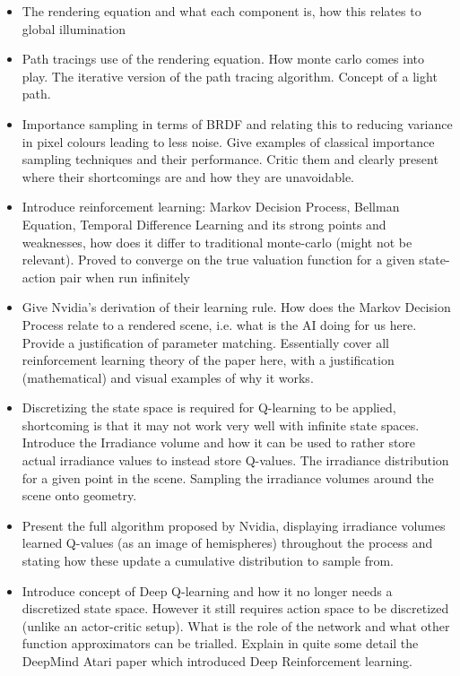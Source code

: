 \documentclass[ %
                    author={Callum Pearce},
                supervisor={Dr. Neill Campbell},
                    degree={MEng},
                     title={How effective are Temporal difference learning methods for reducing the number of zero contribution light paths while still accurately approximating Global Illumination in Path tracing?},
                  subtitle={},
                      type={research},
                      year={2019} ]{dissertation}
\begin{document}
\begin{itemize}
\item The rendering equation and what each component is, how this relates to global illumination

\item Path tracings use of the rendering equation. How monte carlo comes into play. The iterative version of the path tracing algorithm. Concept of a light path.

\item Importance sampling in terms of BRDF and relating this to reducing variance in pixel colours leading to less noise. Give examples of classical importance sampling techniques and their performance. Critic them and clearly present where their shortcomings are and how they are unavoidable.

\item Introduce reinforcement learning: Markov Decision Process, Bellman 
Equation, Temporal Difference Learning and its strong points and weaknesses,
 how does it differ to traditional monte-carlo (might not be relevant). Proved 
 to converge on the true valuation function for a given state-action pair when 
 run infinitely
 
 \item Give Nvidia's derivation of their learning rule. How does the Markov Decision Process relate to a rendered scene, i.e. what is the AI doing for us here. Provide a justification of parameter matching. Essentially cover all reinforcement learning theory of the paper here, with a justification (mathematical) and visual examples of why it works. 
 
 \item Discretizing the state space is required for Q-learning to be applied, shortcoming is that it may not work very well with infinite state spaces. Introduce the Irradiance volume and how it can be used to rather store actual irradiance values to instead store Q-values. The irradiance distribution for a given point in the scene. Sampling the irradiance volumes around the scene onto geometry. 
 
 \item Present the full algorithm proposed by Nvidia, displaying irradiance volumes learned Q-values (as an image of hemispheres) throughout the process and stating how these update a cumulative distribution to sample from.
 
 \item Introduce concept of Deep Q-learning and how it no longer needs a discretized state space. However it still requires action space to be discretized (unlike an actor-critic setup). What is the role of the network and what other function approximators can be trialled. Explain in quite some detail the DeepMind Atari paper which introduced Deep Reinforcement learning.
 
\end{itemize}
\end{document}
